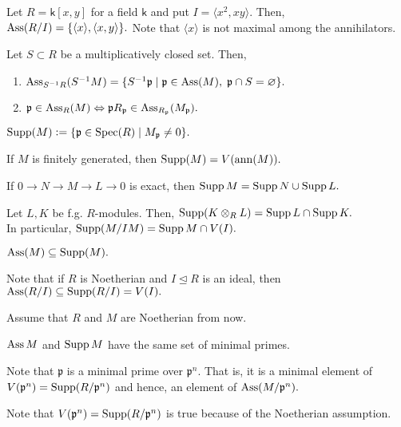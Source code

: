 \documentclass[12pt]{article}	%
\begin{document}
\begin{ex}
	Let $R = \mathsf{k}[x, y]$ for a field $\mathsf{k}$ and put $I = \langle x^2, xy\rangle.$ Then, $\operatorname{Ass}(R/I) = \{\langle x\rangle, \langle x, y\rangle\}.$ Note that $\langle x\rangle$ is not maximal among the annihilators.
\end{ex}

\begin{prop} \label{prop:assoflocalisation}
	Let $S \subset R$ be a multiplicatively closed set. Then,
	\begin{enumerate}
		\item $\operatorname{Ass}_{S^{-1}R}(S^{-1}M) = \{S^{-1}\mathfrak{p} \mid \mathfrak{p} \in \operatorname{Ass}(M),\;\mathfrak{p} \cap S = \varnothing\}.$
		\item $\mathfrak{p} \in \operatorname{Ass}_R(M) \Leftrightarrow \mathfrak{p}R_{\mathfrak{p}} \in \operatorname{Ass}_{R_{\mathfrak{p}}}(M_{\mathfrak{p}}).$
	\end{enumerate}
\end{prop}

\begin{defn}%
	$\operatorname{Supp}(M) \vcentcolon= \{\mathfrak{p} \in \operatorname{Spec}(R) \mid M_{\mathfrak{p}} \neq 0\}.$
\end{defn}
\begin{prop}
	If $M$ is finitely generated, then $\operatorname{Supp}(M) = V(\operatorname{ann}(M)).$
\end{prop}
\begin{prop}
	If $0 \to N \to M \to L \to 0$ is exact, then $\operatorname{Supp} M = \operatorname{Supp} N \cup \operatorname{Supp} L.$
\end{prop}
\begin{prop}
	Let $L, K$ be f.g. $R$-modules. Then, $\operatorname{Supp}(K \otimes_R L) = \operatorname{Supp} L \cap \operatorname{Supp} K.$\\
	In particular, $\operatorname{Supp}(M/IM) = \operatorname{Supp} M \cap V(I).$
\end{prop}

\begin{prop}
	$\operatorname{Ass}(M) \subseteq \operatorname{Supp}(M).$
\end{prop}
Note that if $R$ is Noetherian and $I \unlhd R$ is an ideal, then $\operatorname{Ass}(R/I) \subseteq \operatorname{Supp}(R/I) = V(I).$

\begin{disc}
	Assume that $R$ and $M$ are Noetherian from now.
\end{disc}

\begin{prop}
	$\operatorname{Ass} M$ and $\operatorname{Supp} M$ have the same set of minimal primes.
\end{prop}
\begin{rem}
	Note that $\mathfrak{p}$ is a minimal prime over $\mathfrak{p}^n.$ That is, it is a minimal element of $V(\mathfrak{p}^n) = \operatorname{Supp}(R/\mathfrak{p}^n)$ and hence, an element of $\operatorname{Ass}(M/\mathfrak{p}^n).$

	Note that $V(\mathfrak{p}^n) = \operatorname{Supp}(R/\mathfrak{p}^n)$ is true because of the Noetherian assumption.
\end{rem}
\end{document}

